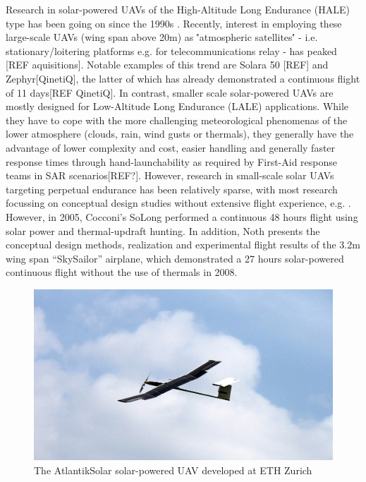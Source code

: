 Research in solar-powered UAVs of the High-Altitude Long Endurance (HALE) type has been going on since the 1990s \cite{Noth_PhD}. Recently, interest in employing these large-scale UAVs (wing span above 20m) as \''atmospheric satellites\'' - i.e. stationary/loitering platforms e.g. for telecommunications relay - has peaked [REF aquisitions]. Notable examples of this trend are Solara 50 [REF] and Zephyr[QinetiQ], the latter of which has already demonstrated a continuous flight of 11 days[REF QinetiQ]. In contrast, smaller scale solar-powered UAVs are mostly designed for Low-Altitude Long Endurance (LALE) applications. While they have to cope with the more challenging meteorological phenomenas of the lower atmosphere (clouds, rain, wind gusts or thermals), they generally have the advantage of lower complexity and cost, easier handling and generally faster response times through hand-launchability as required by First-Aid response teams in SAR scenarios[REF?]. However, research in small-scale solar UAVs targeting perpetual endurance has been relatively sparse, with most research focussing on conceptual design studies without extensive flight experience, e.g. \cite{Morton_ICRA2013}. However, in 2005, Cocconi's SoLong \cite{Cocconi_SoLong} performed a continuous 48 hours flight using solar power and thermal-updraft hunting. In addition, Noth \cite{Noth_PhD} presents the conceptual design methods, realization and experimental flight results of the 3.2m wing span ``SkySailor'' airplane, which demonstrated a 27 hours solar-powered continuous flight without the use of thermals in 2008. 
\begin{figure}[h]
    \centering
    \includegraphics[width=\linewidth]{images/1_AtlantikSolarCollage}
    \caption{The AtlantikSolar solar-powered UAV developed at ETH Zurich}
    \label{fig:AtlantikSolarCollage}
\end{figure}
